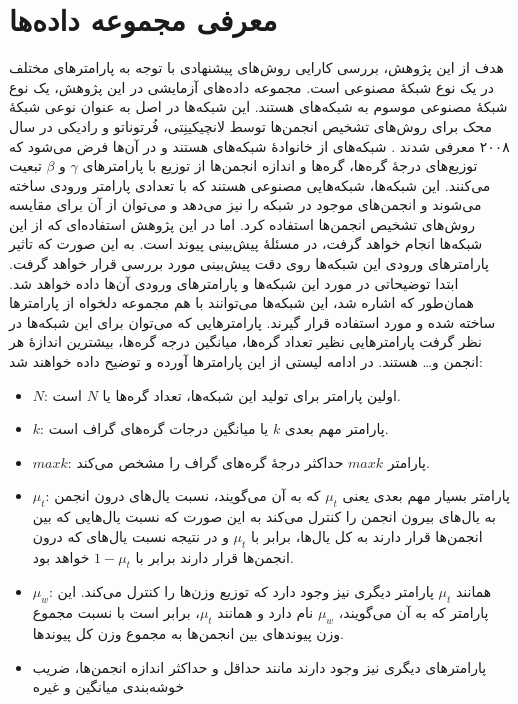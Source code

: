 \section{معرفی مجموعه داده‌ها}
هدف از این پژوهش، بررسی کارایی روش‌های پیشنهادی با توجه به پارامترهای مختلف در یک نوع شبکهٔ مصنوعی است. مجموعه داده‌های آزمایشی در این پژوهش، یک نوع شبکهٔ مصنوعی موسوم به شبکه‌های  هستند. این شبکه‌ها در اصل به عنوان نوعی شبکهٔ محک برای روش‌های تشخیص انجمن‌ها توسط لانچیکینِتی، فُرتوناتو  و رادیکی در سال ۲۰۰۸ معرفی شدند \cite{lancichinetti2008benchmark}. شبکه‌های  از خانوادهٔ شبکه‌های \ScaleFree هستند و در آن‌ها فرض می‌شود که توزیع‌های درجهٔ گره‌ها، \Strength گره‌ها و اندازه انجمن‌ها از توزیع \PowerLaw با پارامترهای $\gamma $ و $\beta $ تبعیت می‌کنند.
این شبکه‌ها، شبکه‌هایی مصنوعی هستند که با تعدادی پارامتر ورودی ساخته می‌شوند و انجمن‌های موجود در شبکه را نیز می‌دهد و می‌توان از آن برای مقایسه روش‌های تشخیص انجمن‌ها استفاده کرد. اما در این پژوهش استفاده‌ای که از این شبکه‌ها انجام خواهد گرفت، در مسئلهٔ پیش‌بینی پیوند است. به این صورت که تاثیر پارامترهای ورودی این شبکه‌ها روی دقت پیش‌بینی مورد بررسی قرار خواهد گرفت. ابتدا توضیحاتی در مورد این شبکه‌ها و پارامترهای ورودی آن‌ها داده خواهد شد.
همان‌طور که اشاره شد، این شبکه‌ها می‌توانند با هم مجموعه دلخواه از پارامترها ساخته شده و مورد استفاده قرار گیرند. پارامترهایی که می‌توان برای این شبکه‌ها در نظر گرفت پارامترهایی نظیر تعداد گره‌ها، میانگین درجه گره‌ها، بیشترین اندازهٔ هر انجمن و… هستند. در ادامه لیستی از این پارامترها آورده و توضیح داده خواهند شد:
\begin{itemize}
  \item $N$: اولین پارامتر برای تولید این شبکه‌ها، تعداد گره‌ها یا $N$ است.
  \item $k$: پارامتر مهم بعدی $k$ یا میانگین درجات گره‌های گراف است.
  \item $maxk$: پارامتر $maxk$ حداکثر درجهٔ گره‌های گراف را مشخص می‌کند.
  \item $\mu_t$:
  پارامتر بسیار مهم بعدی یعنی $\mu_t$ که به آن \Mut{} می‌گویند،
  نسبت یال‌های درون انجمن به یال‌های بیرون انجمن را کنترل می‌کند
  به این صورت که نسبت یال‌هایی که بین انجمن‌ها قرار دارند به کل یال‌ها، برابر با $\mu_t$
  و در نتیجه نسبت یال‌های که درون انجمن‌ها قرار دارند برابر با $1 - \mu_t$ خواهد بود.
  \item $\mu_w$:
  همانند $\mu_t$ پارامتر دیگری نیز وجود دارد که توزیع وزن‌ها را کنترل می‌کند.
  این پارامتر که به آن  \Muw{}  می‌گویند، $\mu_w$ نام دارد و همانند $\mu_t$، برابر است با نسبت مجموع وزن پیوندهای بین انجمن‌ها به مجموع وزن کل پیوندها.
  \item پارامترهای دیگری نیز وجود دارند مانند حداقل و حداکثر اندازه انجمن‌ها، ضریب خوشه‌بندی میانگین و غیره
\end{itemize}
